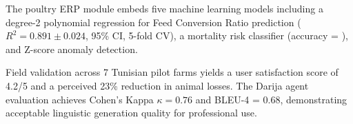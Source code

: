 The poultry ERP module embeds five machine learning models including a
degree-2 polynomial regression for Feed Conversion Ratio prediction
($R^2 = 0.891 \pm 0.024$, 95\% CI, 5-fold CV), a mortality risk
classifier (accuracy = ), and Z-score anomaly detection.

Field validation across 7 Tunisian pilot farms yields a user satisfaction
score of 4.2/5 and a perceived 23\% reduction in animal losses.
The Darija agent evaluation achieves Cohen's Kappa $\kappa = 0.76$ and
BLEU-4 = 0.68, demonstrating acceptable linguistic generation quality
for professional use.
